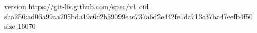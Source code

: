 version https://git-lfs.github.com/spec/v1
oid sha256:ad06a99aa205bda19c6c2b39099eac737a6d2e442fe1da713c37ba47eefb4f50
size 16070
